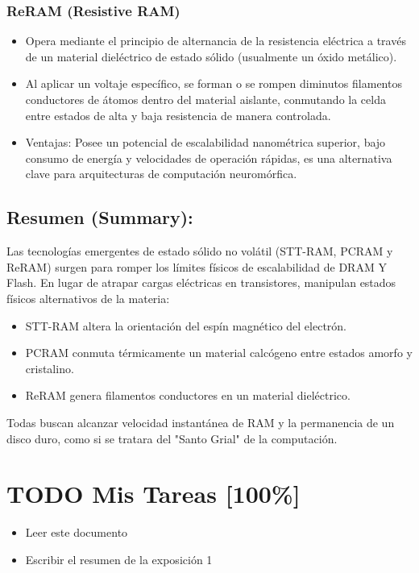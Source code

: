 \documentclass{article}
\begin{document}
\subsubsection{ReRAM (Resistive RAM)}
\label{sec:org915fa72}
\begin{itemize}
\item Opera mediante el principio de alternancia de la resistencia
eléctrica a través de un material dieléctrico de estado sólido
(usualmente un óxido metálico).
\item Al aplicar un voltaje específico, se forman o se rompen diminutos
filamentos conductores de átomos dentro del material aislante,
conmutando la celda entre estados de alta y baja resistencia de
manera controlada.
\item Ventajas: Posee un potencial de escalabilidad nanométrica superior,
bajo consumo de energía y velocidades de operación rápidas, es una
alternativa clave para arquitecturas de computación neuromórfica.
\end{itemize}

\subsection{Resumen (Summary):}
\label{sec:org8cfbdaa}
Las tecnologías emergentes de estado sólido no volátil (STT-RAM,
PCRAM y ReRAM) surgen para romper los límites físicos de escalabilidad
de DRAM Y Flash. En lugar de atrapar cargas eléctricas en
transistores, manipulan estados físicos alternativos de la materia:
\begin{itemize}
\item STT-RAM altera la orientación del espín magnético del electrón.
\item PCRAM conmuta térmicamente un material calcógeno entre estados
amorfo y cristalino.
\item ReRAM genera filamentos conductores en un material dieléctrico.
\end{itemize}
Todas buscan alcanzar velocidad instantánea de RAM y la permanencia de
un disco duro, como si se tratara del "Santo Grial" de la computación.

\section{{\bfseries\sffamily TODO} Mis Tareas [100\%]}
\label{sec:orgc2c7bbf}
\begin{itemize}
\item[{$\boxtimes$}] Leer este documento
\item[{$\boxtimes$}] Escribir el resumen  de la exposición 1
\end{itemize}

\printbibliography
\end{document}
